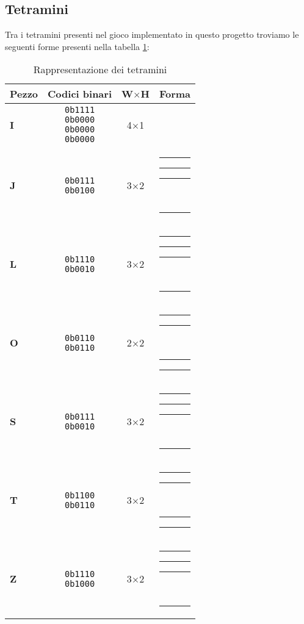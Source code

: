 \documentclass[a4paper, 12pt]{article}
\newcommand{\RedBlock}{\colorbox{red}{\rule{1.2ex}{1.2ex}}}      %
\newcommand{\WhiteBlock}{\fcolorbox{black}{white}{\rule{1.2ex}{1.2ex}}} %
\begin{document}
\subsection{Tetramini}
Tra i tetramini presenti nel gioco implementato in questo progetto troviamo le seguenti forme presenti nella tabella \ref{tab:tetramini}:
\begin{table}[H]
    \centering
    \caption{Rappresentazione dei tetramini}
    \label{tab:tetramini}
    \begin{tabular}{  
      >{\bfseries}l   %
      c               %
      c               %
      l               %
    }
      \toprule
      Pezzo & Codici binari & W\(\times\)H & Forma \\
      \midrule
      I   & \makecell{\texttt{0b1111}\\\texttt{0b0000}\\\texttt{0b0000}\\\texttt{0b0000}} 
          & 4\(\times\)1 
          & \makecell{\RedBlock\RedBlock\RedBlock\RedBlock} \\
      \addlinespace
      J   & \makecell{\texttt{0b0111}\\\texttt{0b0100}} 
          & 3\(\times\)2 
          & \makecell{\WhiteBlock\RedBlock\RedBlock\RedBlock\\\WhiteBlock\RedBlock\WhiteBlock\WhiteBlock} \\
      \addlinespace
      L   & \makecell{\texttt{0b1110}\\\texttt{0b0010}} 
          & 3\(\times\)2 
          & \makecell{\RedBlock\RedBlock\RedBlock\WhiteBlock\\\WhiteBlock\RedBlock\WhiteBlock\WhiteBlock} \\
      \addlinespace
      O   & \makecell{\texttt{0b0110}\\\texttt{0b0110}} 
          & 2\(\times\)2 
          & \makecell{\WhiteBlock\RedBlock\RedBlock\WhiteBlock\\\WhiteBlock\RedBlock\RedBlock\WhiteBlock} \\
      \addlinespace
      S   & \makecell{\texttt{0b0111}\\\texttt{0b0010}} 
          & 3\(\times\)2 
          & \makecell{\WhiteBlock\RedBlock\RedBlock\RedBlock\\\WhiteBlock\WhiteBlock\RedBlock\WhiteBlock} \\
      \addlinespace
      T   & \makecell{\texttt{0b1100}\\\texttt{0b0110}} 
          & 3\(\times\)2 
          & \makecell{\RedBlock\RedBlock\WhiteBlock\WhiteBlock\\\WhiteBlock\RedBlock\RedBlock\WhiteBlock} \\
      \addlinespace
      Z   & \makecell{\texttt{0b1110}\\\texttt{0b1000}} 
          & 3\(\times\)2 
          & \makecell{\RedBlock\RedBlock\RedBlock\WhiteBlock\\\RedBlock\WhiteBlock\WhiteBlock\WhiteBlock} \\
      \bottomrule
    \end{tabular}
  \end{table}
\end{document}
